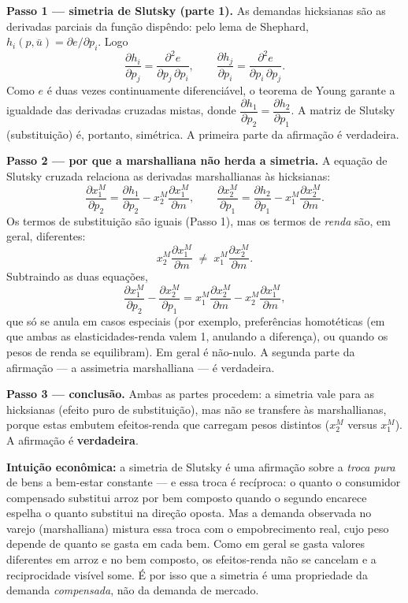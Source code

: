\begin{solucao}
\textbf{Passo 1 --- simetria de Slutsky (parte 1).} As demandas hicksianas são as derivadas parciais da função dispêndo: pelo lema de Shephard, $h_i(p,\bar u)=\partial e/\partial p_i$. Logo
\[
\frac{\partial h_i}{\partial p_j}=\frac{\partial^2 e}{\partial p_j\,\partial p_i},\qquad \frac{\partial h_j}{\partial p_i}=\frac{\partial^2 e}{\partial p_i\,\partial p_j}.
\]
Como $e$ é duas vezes continuamente diferenciável, o teorema de Young garante a igualdade das derivadas cruzadas mistas, donde $\dfrac{\partial h_1}{\partial p_2}=\dfrac{\partial h_2}{\partial p_1}$. A matriz de Slutsky (substituição) é, portanto, simétrica. A primeira parte da afirmação é verdadeira.

\textbf{Passo 2 --- por que a marshalliana não herda a simetria.} A equação de Slutsky cruzada relaciona as derivadas marshallianas às hicksianas:
\[
\frac{\partial x_1^{M}}{\partial p_2}=\frac{\partial h_1}{\partial p_2}-x_2^{M}\frac{\partial x_1^{M}}{\partial m},\qquad
\frac{\partial x_2^{M}}{\partial p_1}=\frac{\partial h_2}{\partial p_1}-x_1^{M}\frac{\partial x_2^{M}}{\partial m}.
\]
Os termos de substituição são iguais (Passo 1), mas os termos de \emph{renda} são, em geral, diferentes:
\[
x_2^{M}\frac{\partial x_1^{M}}{\partial m}\;\neq\;x_1^{M}\frac{\partial x_2^{M}}{\partial m}.
\]
Subtraindo as duas equações,
\[
\frac{\partial x_1^{M}}{\partial p_2}-\frac{\partial x_2^{M}}{\partial p_1}=x_1^{M}\frac{\partial x_2^{M}}{\partial m}-x_2^{M}\frac{\partial x_1^{M}}{\partial m},
\]
que só se anula em casos especiais (por exemplo, preferências homotéticas (em que ambas as elasticidades-renda valem 1, anulando a diferença), ou quando os pesos de renda se equilibram). Em geral é não-nulo. A segunda parte da afirmação --- a assimetria marshalliana --- é verdadeira.

\textbf{Passo 3 --- conclusão.} Ambas as partes procedem: a simetria vale para as hicksianas (efeito puro de substituição), mas não se transfere às marshallianas, porque estas embutem efeitos-renda que carregam pesos distintos ($x_2^{M}$ versus $x_1^{M}$). A afirmação é \textbf{verdadeira}.

\textbf{Intuição econômica:} a simetria de Slutsky é uma afirmação sobre a \emph{troca pura} de bens a bem-estar constante --- e essa troca é recíproca: o quanto o consumidor compensado substitui arroz por bem composto quando o segundo encarece espelha o quanto substitui na direção oposta. Mas a demanda observada no varejo (marshalliana) mistura essa troca com o empobrecimento real, cujo peso depende de quanto se gasta em cada bem. Como em geral se gasta valores diferentes em arroz e no bem composto, os efeitos-renda não se cancelam e a reciprocidade visível some. É por isso que a simetria é uma propriedade da demanda \emph{compensada}, não da demanda de mercado.
\end{solucao}

